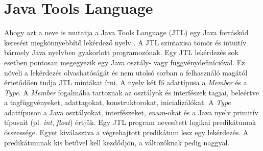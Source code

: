 \documentclass[a4paper,12pt]{report}
\begin{document}
\section{Java Tools Language}
\par Ahogy azt a neve is mutatja a Java Tools Language (JTL) egy Java forráskód keresést megkönnyebbítő lekérdező nyelv \cite{jtl}. A JTL szintaxisa tömör és intuitív bármely Java nyelvben gyakorlott programozónak. Egy JTL lekérdezés sok esetben pontosan megegyezik egy Java osztály- vagy függvénydefinícióval. Ez növeli a lekérdezés olvashatóságát és nem utolsó sorban a felhasználó magától értetődően tudja JTL mintákat írni. A nyelv két fő adattípusa a \textit{Member} és a \textit{Type}. A \textit{Member} fogalmába tartoznak az osztályok és interfészek tagjai, beleértve a tagfüggvényeket, adattagokat, konstruktorokat, inicializálókat. A \textit{Type} adattípuson a Java osztályokat, interfészeket, \textit{enum}-okat és a Java nyelv primitív típusait (pl. \textit{int}, \textit{float}) értjük. Egy JTL program nevesített logikai predikátumok összessége.  Egyet kiválasztva a végrehajtott predikátum lesz egy lekérdezés. A predikátumnak kis betűvel kell kezdődjön, a változóknak pedig naggyal.
\end{document}
